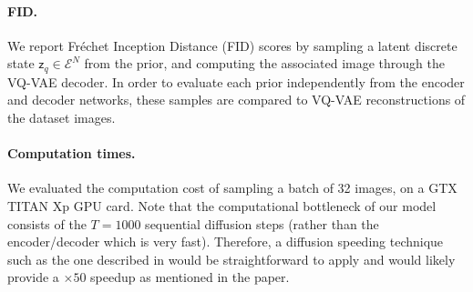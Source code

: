 \documentclass{article}
\theoremstyle{plain}
\theoremstyle{definition}
\theoremstyle{remark}
\newcommand{\latentdis}{\mathsf{z}_q}
\newcommand{\embedspace}{\mathcal{E}}
\begin{document}
\paragraph{FID. }
We report Fr\'echet Inception Distance (FID) scores by sampling a latent discrete state $\latentdis \in \embedspace^N$ from the prior, and computing the associated image through the VQ-VAE decoder. In order to evaluate each prior independently from the encoder and decoder networks, these samples are compared to VQ-VAE reconstructions of the dataset images. 

\paragraph{Computation times. }
We evaluated the computation cost of sampling a batch of 32 images, on a GTX TITAN Xp GPU card. Note that the computational bottleneck of our model consists of the $T=1000$ sequential diffusion steps (rather than the encoder/decoder which is very fast). Therefore, a diffusion speeding technique such as the one described in \cite{song2021denoising} would be straightforward to apply and would likely provide a $\times 50$ speedup as mentioned in the paper. 

\begin{table}
    \caption{Results on \textit{mini}ImageNet. Metrics are computed on the validation dataset. The means are displayed along with the standard deviation in parenthesis.}
\centering
    \label{tab:miniimagenet}
\end{table}

\begin{table}
    \caption{Results on CIFAR10. Metrics are computed on the validation dataset. The means are displayed along with the standard deviation in parenthesis.}
\centering
    \label{tab:cifar}
\end{table}
\end{document}
